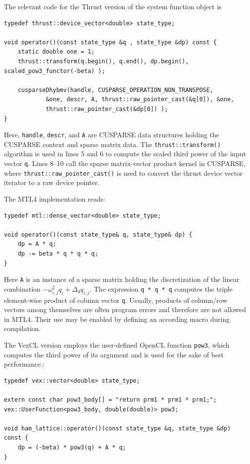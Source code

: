\documentclass[final]{siamltex}
\newcommand{\code}[1]{\lstinline|#1|}
\begin{document}
The relevant code for the Thrust version of the system function object is
\begin{lstlisting}
typedef thrust::device_vector<double> state_type;

void operator()(const state_type &q , state_type &dp) const {
    static double one = 1;
    thrust::transform(q.begin(), q.end(), dp.begin(), scaled_pow3_functor(-beta) );

    cusparseDhybmv(handle, CUSPARSE_OPERATION_NON_TRANSPOSE,
            &one, descr, A, thrust::raw_pointer_cast(&q[0]), &one,
            thrust::raw_pointer_cast(&dp[0]) );
}
\end{lstlisting}
Here, \code{handle}, \code{descr}, and \code{A} are CUSPARSE data structures
holding the CUSPARSE context and sparse matrix data. The
\code{thrust::transform()} algorithm is used in lines 5 and 6 to compute the
scaled third power of the input vector \code{q}. Lines 8--10 call the sparse
matrix-vector product kernel in CUSPARSE, where
\code{thrust::raw_pointer_cast()} is used to convert the thrust device vector
iterator to a raw device pointer.

The MTL4 implementation reads:
\begin{lstlisting}
typedef mtl::dense_vector<double> state_type;

void operator()(const state_type& q, state_type& dp) {
    dp = A * q;
    dp -= beta * q * q * q;
}
\end{lstlisting}
Here \code{A} is an instance of a sparse matrix holding the discretization of
the linear combination $- \omega_{i,j}^2 q_i + \Delta_d q_{i,j}$. The
expression \code{q * q * q} computes the triple element-wise product of column
vector \code{q}.  Usually, products of column/row vectors among themselves are
often program errors and therefore are not allowed in MTL4.  Their use may be
enabled by defining an according macro during compilation.

The VexCL version employs the user-defined OpenCL function \code{pow3}, which
computes the third power of its argument and is used for the sake of best
performance.:
\begin{lstlisting}
typedef vex::vector<double> state_type;

extern const char pow3_body[] = "return prm1 * prm1 * prm1;";
vex::UserFunction<pow3_body, double(double)> pow3;

void ham_lattice::operator()(const state_type &q, state_type &dp) const {
    dp = (-beta) * pow3(q) + A * q;
}
\end{lstlisting}
\end{document}
